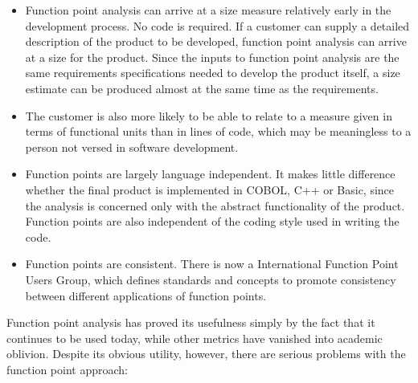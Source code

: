 \begin{itemize}

\item Function point analysis can arrive at a size measure relatively
early in the development process.  No code is required.  If a customer 
can supply a detailed description of the product to be developed,
function point analysis can arrive at a size for the product.  Since
the inputs to function point analysis are the same requirements
specifications needed to develop the product itself,  a size estimate
can be produced almost at the same time as the requirements.

\item The customer is also more likely to be able to relate to a
measure given in terms of functional units than in lines of code,
which may be meaningless to a person not versed in software
development. 

\item Function points are largely language independent.  It makes
little difference whether the final product is implemented in COBOL,
C++ or Basic, since the analysis is concerned only with the abstract
functionality of the product. Function points are also independent of
the coding style used in writing the code.

\item Function points are consistent.  There is now a International
Function Point Users Group, which defines standards and concepts to
promote consistency between different applications of function points.

\end{itemize}

Function point analysis has proved its usefulness simply by the fact
that it continues to be used today, while other metrics have vanished
into academic oblivion.  Despite its obvious utility, however, there 
are serious problems with the function point approach:

